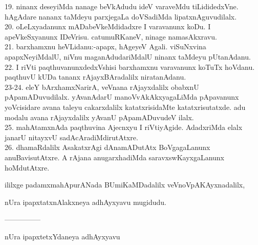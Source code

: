 \documentclass{article}
\begin{document}
19. ninanx deseyiMda nanage beVkAdudu ideV varaveMdu tiLididedxVne. hAgAdare nananx taMdeyu parxjegaLa doVSadiMda lipatxnAguvudilalx.\\
20. oLeLxyadanunx mADabeVkeMdidadxre I varavanunx koDu. I apeVkeSxyanunx IDeVrisu. catumuRKaneV, ninage namasAkxravu.\\
21. barxhamxnu heVLidanu:-apapx, hAgeyeV Agali. viSuNxvina apapxNeyiMdalU, niVnu maganAdudariMdalU ninanx taMdeyu pUtanAdanu.\\
22. I riVti paqthuvanunxdedxVshisi barxhamxnu varavanunx koTuTx hoVdanu. paqthuvU kUDa tananx rAjayxBAradalilx niratanAdanu.\\
23-24. eleY bArxhamxNarirA, veVnana rAjayxdalilx obabxnU pApamADuvudilalx. yAvanAdarU manoVvAkAkxyagaLiMda pApavanunx yoVcisidare avana taleyu cakarxdalilx katatxrisidaMte katatxrisutatxde. adu modalu avana rAjayxdalilx yAvanU pApamADuvudeV ilalx.\\
25. mahAtamxnAda paqthuvina Ajecnxyu I riVtiyAgide. AdadxriMda elalx janarU nitayxvU sadAcAradiMdirutAtxre.\\
26. dhamaRdalilx AsakatxrAgi dAnamADutAtx BoVgagaLanunx anuBavisutAtxre. A rAjana anugarxhadiMda saravxswKayxgaLanunx hoMdutAtxre.

\begin{center}
ililxge padamxmahApurANada BUmiKaMDadalilx veVnoVpAKAyxnadalilx,
\end{center}

\begin{center}
nUra ipapxtatxnAlakxneya adhAyxyavu mugidudu.
\end{center}

\begin{center}
---------------
\end{center}

\begin{center}
nUra ipapxtetxYdaneya adhAyxyavu
\end{center}
\end{document}
